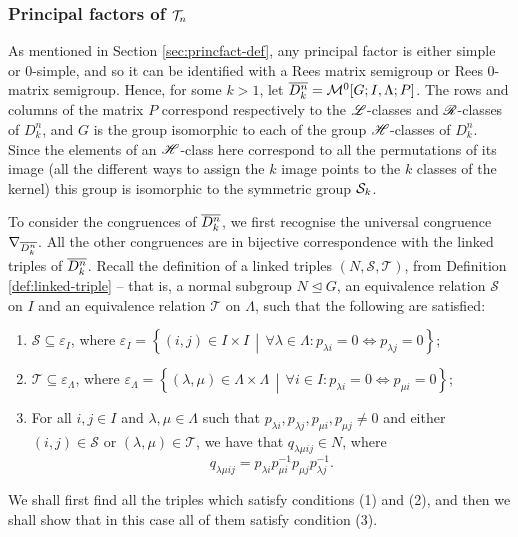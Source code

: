 \subsubsection{Principal factors of $\mathcal{T}_n$}
As mentioned in Section \ref{sec:princfact-def}, any principal factor is either
simple or 0-simple, and so it can be identified with a Rees matrix semigroup or
Rees 0-matrix semigroup.  Hence, for some $k > 1$, let
$\overline{D_k^n} = \mathcal{M}^0[G;I,\Lambda;P]$.  The rows and columns of the matrix
$P$ correspond respectively to the $\mathrel{\mathscr{L}}$-classes and $\mathrel{\mathscr{R}}$-classes of $D_k^n$,
and $G$ is the group isomorphic to each of the group $\mathrel{\mathscr{H}}$-classes of $D_k^n$.
Since the elements of an $\mathrel{\mathscr{H}}$-class here correspond to all the permutations of
its image (all the different ways to assign the $k$ image points to the $k$
classes of the kernel) this group is isomorphic to the symmetric group $\mathcal{S}_k$.

To consider the congruences of $\overline{D_k^n}$, we first recognise the universal
congruence $\nabla_{\overline{D_k^n}}$.  All the other congruences are in bijective
correspondence with the linked triples of $\overline{D_k^n}$.  Recall the definition
of a linked triples $(N,\mathcal{S},\mathcal{T})$, from Definition
\ref{def:linked-triple} -- that is, a normal subgroup $N \trianglelefteq G$, an
equivalence relation $\mathcal{S}$ on $I$ and an equivalence relation
$\mathcal{T}$ on $\Lambda$, such that the following are satisfied:
\begin{enumerate}[\rm(1)]
\item $\mathcal{S} \subseteq \varepsilon_I$, where
  $\varepsilon_I = \left\{(i,j) \in I \times I\, \middle|\, \forall \lambda \in
    \Lambda: p_{\lambda i}=0 \iff p_{\lambda j}=0 \right\}$;
\item $\mathcal{T} \subseteq \varepsilon_\Lambda$, where
  $\varepsilon_\Lambda = \left\{(\lambda,\mu) \in \Lambda \times \Lambda\,
    \middle|\, \forall i \in I: p_{\lambda i}=0 \iff p_{\mu i}=0 \right\}$;
\item For all $i,j \in I$ and $\lambda, \mu \in \Lambda$ such that
  $p_{\lambda i}, p_{\lambda j}, p_{\mu i}, p_{\mu j} \neq 0$ and either
  $(i,j) \in \mathcal{S}$ or $(\lambda,\mu) \in \mathcal{T}$, we have that
  $q_{\lambda \mu i j} \in N$, where
  $$q_{\lambda \mu i j} = p_{\lambda i} p_{\mu i}^{-1} p_{\mu j} p_{\lambda
    j}^{-1}.$$
\end{enumerate}
We shall first find all the triples which satisfy conditions (1) and (2), and
then we shall show that in this case all of them satisfy condition (3).

